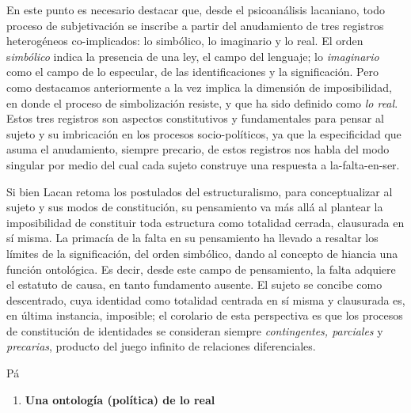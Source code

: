 En este punto es necesario destacar que, desde el psicoanálisis lacaniano, todo proceso de subjetivación se inscribe a partir del anudamiento de tres registros heterogéneos co-implicados: lo simbólico, lo imaginario y lo real. El orden s\emph{imbólico} indica la presencia de una ley, el campo del lenguaje; lo \emph{imaginario} como el campo de lo especular, de las identificaciones y la significación. Pero como destacamos anteriormente a la vez implica la dimensión de imposibilidad, en donde el proceso de simbolización resiste, y que ha sido definido como \emph{lo real}. Estos tres registros son aspectos constitutivos y fundamentales para pensar al sujeto y su imbricación en los procesos socio-políticos, ya que la especificidad que asuma el anudamiento, siempre precario, de estos registros nos habla del modo singular por medio del cual cada sujeto construye una respuesta a la-falta-en-ser.

Si bien Lacan retoma los postulados del estructuralismo, para conceptualizar al sujeto y sus modos de constitución, su pensamiento va más allá al plantear la imposibilidad de constituir toda estructura como totalidad cerrada, clausurada en sí misma. La primacía de la falta en su pensamiento ha llevado a resaltar los límites de la significación, del orden simbólico, dando al concepto de hiancia una función ontológica. Es decir, desde este campo de pensamiento, la falta adquiere el estatuto de causa, en tanto fundamento ausente. El sujeto se concibe como descentrado, cuya identidad como totalidad centrada en sí misma y clausurada es, en última instancia, imposible; el corolario de esta perspectiva es que los procesos de constitución de identidades se consideran siempre \emph{contingentes, parciales }y\emph{ precarias}, producto del juego infinito de relaciones diferenciales.

Pá

\begin{enumerate}
\def\labelenumi{\arabic{enumi}.}
\item
  \textbf{Una ontología (política) de lo real}
\end{enumerate}

